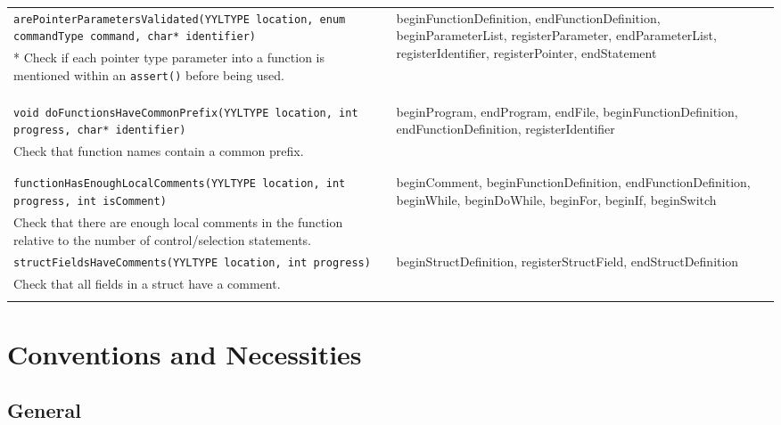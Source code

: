 \documentclass[12pt]{report}
\begin{document}
\begin{longtable}{p{10cm} p{\saxColSize}}
		\lstinline!arePointerParametersValidated(YYLTYPE location, enum commandType command, char* identifier)! & \multirow{2}{\saxColSize}{beginFunctionDefinition, endFunctionDefinition, beginParameterList, registerParameter, endParameterList, registerIdentifier, registerPointer, endStatement} \\ *
			Check if each pointer type parameter into a function is mentioned within an \lstinline!assert()! before being used. \vspace{\vertSize} \\ \\ \\ \\
		\lstinline!void doFunctionsHaveCommonPrefix(YYLTYPE location, int progress, char* identifier)! & \multirow{2}{\saxColSize}{beginProgram, endProgram, endFile, beginFunctionDefinition, endFunctionDefinition, registerIdentifier} \\*
			Check that function names contain a common prefix.  \vspace{\vertSize} \\ \\ \\
		\lstinline!functionHasEnoughLocalComments(YYLTYPE location, int progress, int isComment)! & \multirow{2}{\saxColSize}{beginComment, beginFunctionDefinition, endFunctionDefinition, beginWhile, beginDoWhile, beginFor, beginIf, beginSwitch} \\*
			Check that there are enough local comments in the function relative to the number of control/selection statements.  \vspace{\vertSize} \\
		\lstinline!structFieldsHaveComments(YYLTYPE location, int progress)! & \multirow{2}{\saxColSize}{beginStructDefinition, registerStructField, endStructDefinition} \\*
			Check that all fields in a struct have a comment.  \\

\vspace{1mm}
\end{longtable}

\doublespacing
\chapter{Conventions and Necessities}
\label{conventions}

\section{General}
\end{document}
